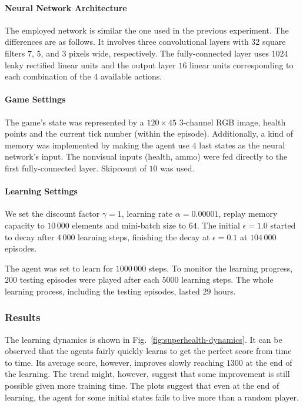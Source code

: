 \documentclass[english,american,conference, balance]{IEEEtran}
\begin{document}
\paragraph{Neural Network Architecture}

  The employed network is similar the one used in the previous experiment.
The differences are as follows. It involves three convolutional layers
with  $32$ square filters $7$, $5$, and $3$ pixels wide, respectively.
The fully-connected layer uses $1024$ leaky rectified linear units
and the output layer $16$ linear units corresponding to each combination
of the $4$ available actions.

\paragraph{Game Settings}

The game's state was represented by a $120\times45$ $3$-channel
RGB image, health points and the current tick number (within the episode).
 Additionally, a kind of memory was implemented by making the agent
use $4$ last states as the neural network's input. The nonvisual
inputs (health, ammo) were fed directly to the first fully-connected
layer. Skipcount of $10$ was used.

\paragraph{Learning Settings}

We set the discount factor $\gamma=1$, learning rate $\alpha=0.00001$,
replay memory capacity to $10\,000$ elements and mini-batch size
to $64$. The initial $\epsilon=1.0$ started to decay after $4\,000$
learning steps, finishing the decay at $\epsilon=0.1$ at $104\,000$
episodes.

The agent was set to learn for $1000\,000$ steps. To monitor the
learning progress, $200$ testing episodes were played after each
$5000$ learning steps. The whole learning process, including the
testing episodes, lasted $29$ hours.

\subsubsection{Results}

The learning dynamics is shown in Fig.~\ref{fig:superhealth-dynamics}.
It can be observed that the agents fairly quickly learns to get the
perfect score from time to time. Its average score, however, improves
slowly reaching $1300$ at the end of the learning. The trend might,
however, suggest that some improvement is still possible given more
training time. The plots suggest that even at the end of learning,
the agent for some initial states fails to live more than a random
player. 
\end{document}
